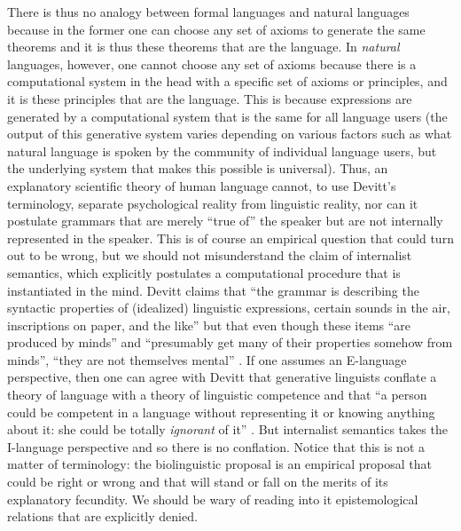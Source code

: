 There is thus no analogy between formal languages and natural languages because in the former one can choose any set of axioms to generate the same theorems and it is thus these theorems that are the language. In \textit{natural} languages, however, one cannot choose any set of axioms because there is a computational system in the head with a specific set of axioms or principles, and it is these principles that are the language. This is because expressions are generated by a computational system that is the same for all language users (the output of this generative system varies depending on various factors such as what natural language is spoken by the community of individual language users, but the underlying system that makes this possible is universal). Thus, an explanatory scientific theory of human language cannot, to use Devitt’s terminology, separate psychological reality from linguistic reality, nor can it postulate grammars that are merely “true of” the speaker but are not internally represented in the speaker. This is of course an empirical question that could turn out to be wrong, but we should not misunderstand the claim of internalist semantics, which explicitly postulates a computational procedure that is instantiated in the mind. Devitt claims that “the grammar is describing the syntactic properties of (idealized) linguistic expressions, certain sounds in the air, inscriptions on paper, and the like” but that even though these items “are produced by minds” and “presumably get many of their properties somehow from minds”, “they are not themselves mental” \citep[v]{Devitt2006}. If one assumes an E-language perspective, then one can agree with Devitt that generative linguists conflate a theory of language with a theory of linguistic competence and that “a person could be competent in a language without representing it or knowing anything about it: she could be totally \textit{ignorant} of it” \citep[5, emphasis in original]{Devitt2006}. But internalist semantics takes the I-language perspective and so there is no conflation. Notice that this is not a matter of terminology: the biolinguistic proposal is an empirical proposal that could be right or wrong and that will stand or fall on the merits of its explanatory fecundity. We should be wary of reading into it epistemological relations that are explicitly denied.

